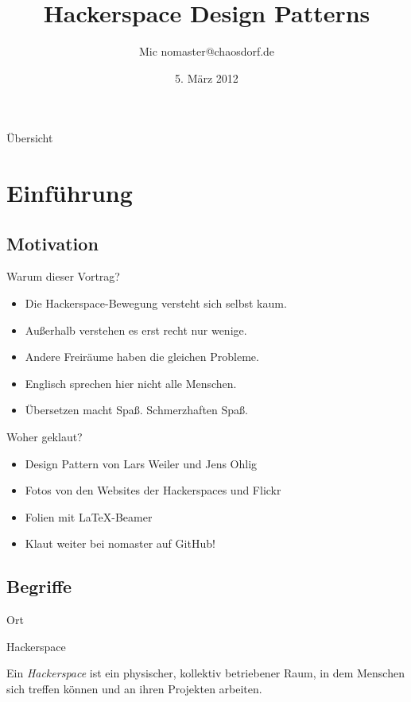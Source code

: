 \documentclass[aspectratio=1610]{beamer}
\title{Hackerspace Design Patterns}
\author[Mic]{Mic \flq nomaster@chaosdorf.de\frq}
\institute[niemandsland]{Niemandsland e.V.}
\date[]{5. März 2012}
\newcommand{\concept}[2]{
  \begin{block}{#1}
    \pause
    #2
  \end{block}
}
\begin{document}
  \begin{frame}
    \titlepage
  \end{frame}

  \begin{frame}{Übersicht}
    \tableofcontents
  \end{frame}

  \section{Einführung}

  \subsection{Motivation}

  \begin{frame}{Warum dieser Vortrag?}
    \begin{itemize}
    \item Die Hackerspace-Bewegung versteht sich selbst kaum.
    \pause
    \item Außerhalb verstehen es erst recht nur wenige.
    \pause
    \item Andere Freiräume haben die gleichen Probleme.
    \pause
    \item Englisch sprechen hier nicht alle Menschen.
    \pause
    \item Übersetzen macht Spaß. Schmerzhaften Spaß.
    \end{itemize}
  \end{frame}

  \begin{frame}{Woher geklaut?}
    \begin{itemize}
      \item Design Pattern von Lars Weiler und Jens Ohlig
      \item Fotos von den Websites der Hackerspaces und Flickr
      \item Folien mit \LaTeX-Beamer
      \item Klaut weiter bei nomaster auf GitHub!
    \end{itemize}
  \end{frame}

  \subsection{Begriffe}

  \begin{frame}{Ort}
    \concept{Hackerspace}{
      Ein \textsl{Hackerspace} ist ein physischer, kollektiv betriebener Raum,
      in dem Menschen sich treffen können und an ihren Projekten arbeiten.
    }
  \end{frame}
\end{document}
